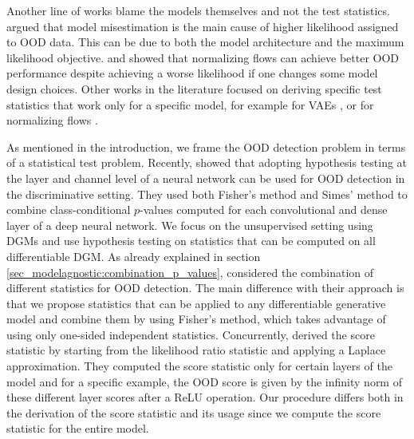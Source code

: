 {Another line of works blame the models themselves and not the test statistics. \textcite{zhang_understanding_2021} argued that model misestimation is the main cause of higher likelihood assigned to OOD data. This can be due to both the model architecture and the maximum likelihood objective. \textcite{kirichenko_why_2020} and \textcite{schirrmeister_understanding_2020} showed that normalizing flows can achieve better OOD performance despite achieving a worse likelihood if one changes some model design choices.
%
Other works in the literature focused on deriving specific test statistics that work only for a specific model, for example for VAEs \parencite{xiao_likelihood_2020, maaloe_biva_2019, havtorn_hierarchical_2021}, or for normalizing flows \parencite{kirichenko_why_2020, ahmadian_likelihoodfree_2021}.


As mentioned in the introduction, we frame the OOD detection problem in terms of a statistical test problem. Recently, \textcite{haroush_statistical_2021} showed that adopting hypothesis testing at the layer and channel level of a neural network can be used for OOD detection in the discriminative setting. They used both Fisher's method and Simes' method to combine class-conditional $p$-values computed for each convolutional and dense layer of a deep neural network. We focus on the unsupervised setting using DGMs and use hypothesis testing on statistics that can be computed on all differentiable DGM. As already explained in section \cref{sec_modelagnostic:combination_p_values}, \textcite{morningstar_density_2021} considered the combination of different statistics for OOD detection. The main difference with their approach is that we propose statistics that can be applied to any differentiable generative model and combine them by using Fisher's method, which takes advantage of using only one-sided independent statistics. Concurrently, \textcite{choi_robust_2021} derived the score statistic by starting from the likelihood ratio statistic and applying a Laplace approximation. They computed the score statistic only for certain layers of the model and for a specific example, the OOD score is given by the infinity norm of these different layer scores after a ReLU operation. Our procedure differs both in the derivation of the score statistic and its usage since we compute the score statistic for the entire model.

}
